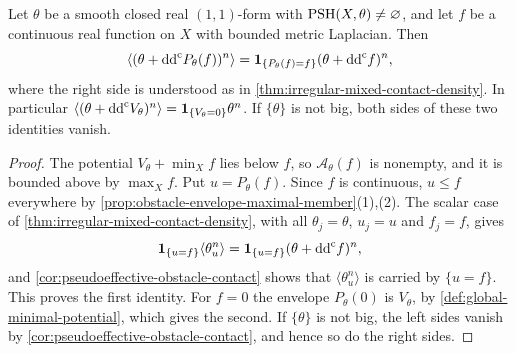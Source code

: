 \begin{corollary}\label{cor:pseudoeffective-regular-obstacle-density}
Let $\theta$ be a smooth closed real $(1,1)$-form with $\mathrm{PSH}(X,\theta)\neq\varnothing$, and let $f$ be a continuous real function on $X$ with bounded metric Laplacian. Then
\[
 \langle(\theta+\mathrm{dd}^{\mathrm{c}} P_\theta(f))^n\rangle
   =\mathbf1_{\{P_\theta(f)=f\}}(\theta+\mathrm{dd}^{\mathrm{c}} f)^n,
\]
where the right side is understood as in \cref{thm:irregular-mixed-contact-density}. In particular $\langle(\theta+\mathrm{dd}^{\mathrm{c}} V_\theta)^n\rangle=\mathbf1_{\{V_\theta=0\}}\theta^n$. If $\{\theta\}$ is not big, both sides of these two identities vanish.
\end{corollary}
\begin{proof}
The potential $V_\theta+\min_Xf$ lies below $f$, so $\mathcal A_\theta(f)$ is nonempty, and it is bounded above by $\max_Xf$. Put $u=P_\theta(f)$. Since $f$ is continuous, $u\leq f$ everywhere by \cref{prop:obstacle-envelope-maximal-member}(1),(2). The scalar case of \cref{thm:irregular-mixed-contact-density}, with all $\theta_j=\theta$, $u_j=u$ and $f_j=f$, gives
\[
 \mathbf1_{\{u=f\}}\langle\theta_u^n\rangle=\mathbf1_{\{u=f\}}(\theta+\mathrm{dd}^{\mathrm{c}} f)^n,
\]
and \cref{cor:pseudoeffective-obstacle-contact} shows that $\langle\theta_u^n\rangle$ is carried by $\{u=f\}$. This proves the first identity. For $f=0$ the envelope $P_\theta(0)$ is $V_\theta$, by \cref{def:global-minimal-potential}, which gives the second. If $\{\theta\}$ is not big, the left sides vanish by \cref{cor:pseudoeffective-obstacle-contact}, and hence so do the right sides.
\end{proof}
